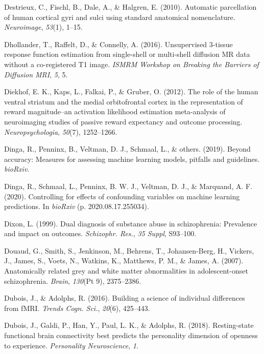 \documentclass[11pt,american,]{memoir} %
\begin{document}
\leavevmode\hypertarget{ref-Destrieux2010-rd}{}%
Destrieux, C., Fischl, B., Dale, A., \& Halgren, E. (2010). Automatic parcellation of human cortical gyri and sulci using standard anatomical nomenclature. \emph{Neuroimage}, \emph{53}(1), 1--15.

\leavevmode\hypertarget{ref-Dhollander2016-dx}{}%
Dhollander, T., Raffelt, D., \& Connelly, A. (2016). Unsupervised 3-tissue response function estimation from single-shell or multi-shell diffusion MR data without a co-registered T1 image. \emph{ISMRM Workshop on Breaking the Barriers of Diffusion MRI}, \emph{5}, 5.

\leavevmode\hypertarget{ref-diekhof2012role}{}%
Diekhof, E. K., Kaps, L., Falkai, P., \& Gruber, O. (2012). The role of the human ventral striatum and the medial orbitofrontal cortex in the representation of reward magnitude--an activation likelihood estimation meta-analysis of neuroimaging studies of passive reward expectancy and outcome processing. \emph{Neuropsychologia}, \emph{50}(7), 1252--1266.

\leavevmode\hypertarget{ref-Dinga2019-mh}{}%
Dinga, R., Penninx, B., Veltman, D. J., Schmaal, L., \& others. (2019). Beyond accuracy: Measures for assessing machine learning models, pitfalls and guidelines. \emph{bioRxiv}.

\leavevmode\hypertarget{ref-Dinga2020-si}{}%
Dinga, R., Schmaal, L., Penninx, B. W. J., Veltman, D. J., \& Marquand, A. F. (2020). Controlling for effects of confounding variables on machine learning predictions. In \emph{bioRxiv} (p. 2020.08.17.255034).

\leavevmode\hypertarget{ref-Dixon1999-kl}{}%
Dixon, L. (1999). Dual diagnosis of substance abuse in schizophrenia: Prevalence and impact on outcomes. \emph{Schizophr. Res.}, \emph{35 Suppl}, S93--100.

\leavevmode\hypertarget{ref-Douaud2007-sw}{}%
Douaud, G., Smith, S., Jenkinson, M., Behrens, T., Johansen-Berg, H., Vickers, J., James, S., Voets, N., Watkins, K., Matthews, P. M., \& James, A. (2007). Anatomically related grey and white matter abnormalities in adolescent-onset schizophrenia. \emph{Brain}, \emph{130}(Pt 9), 2375--2386.

\leavevmode\hypertarget{ref-Dubois2016-zz}{}%
Dubois, J., \& Adolphs, R. (2016). Building a science of individual differences from fMRI. \emph{Trends Cogn. Sci.}, \emph{20}(6), 425--443.

\leavevmode\hypertarget{ref-dubois2018resting}{}%
Dubois, J., Galdi, P., Han, Y., Paul, L. K., \& Adolphs, R. (2018). Resting-state functional brain connectivity best predicts the personality dimension of openness to experience. \emph{Personality Neuroscience}, \emph{1}.
\end{document}
